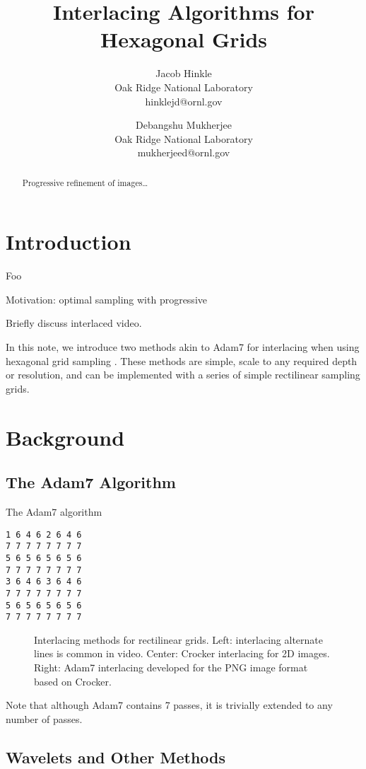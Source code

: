 \documentclass{article}
\title{Interlacing Algorithms for Hexagonal Grids}
\author{Jacob Hinkle\\
Oak Ridge National Laboratory\\
hinklejd@ornl.gov \and Debangshu Mukherjee\\
Oak Ridge National Laboratory\\
mukherjeed@ornl.gov}
\date{}
\begin{document}
\maketitle
\begin{abstract}
Progressive refinement of images\ldots{}
\end{abstract}

\section{Introduction}
\label{sec:intro}

Foo

Motivation: optimal sampling with progressive

Briefly discuss interlaced video.

In this note, we introduce two methods akin to Adam7 for interlacing when using
hexagonal grid sampling \citep{rfc2083}.
%
These methods are simple, scale to any required depth or resolution, and can be
implemented with a series of simple rectilinear sampling grids.

\cite{jeevan2014compression}


\section{Background}
\label{sec:bg}

\subsection{The Adam7 Algorithm}
\label{sec:adam7}

The Adam7 algorithm

\begin{verbatim}
1 6 4 6 2 6 4 6
7 7 7 7 7 7 7 7
5 6 5 6 5 6 5 6
7 7 7 7 7 7 7 7
3 6 4 6 3 6 4 6
7 7 7 7 7 7 7 7
5 6 5 6 5 6 5 6
7 7 7 7 7 7 7 7
\end{verbatim}

\begin{figure}[ht]
\caption{\label{fig:squareinterlacing} Interlacing methods for rectilinear grids. Left: interlacing alternate lines is common in video. Center: Crocker interlacing for 2D images. Right: Adam7 interlacing developed for the PNG image format based on Crocker.}
\end{figure}

Note that although Adam7 contains 7 passes, it is trivially extended to
any number of passes.

\subsection{Wavelets and Other Methods}
\label{sec:wavelets}
\end{document}
